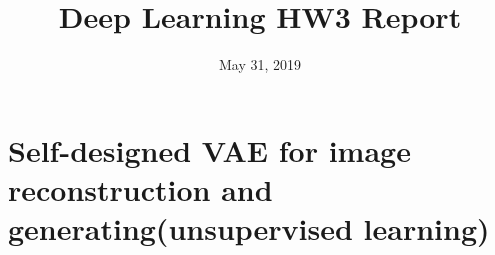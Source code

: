 \documentclass[11pt, a4paper]{article} %
\title{Deep Learning HW3 Report} %
\begin{document}


\date{May 31, 2019}

\maketitle{} %

\setcounter{page}{1} %

\section{Self-designed VAE for image reconstruction and generating(unsupervised learning)} %
\end{document}
